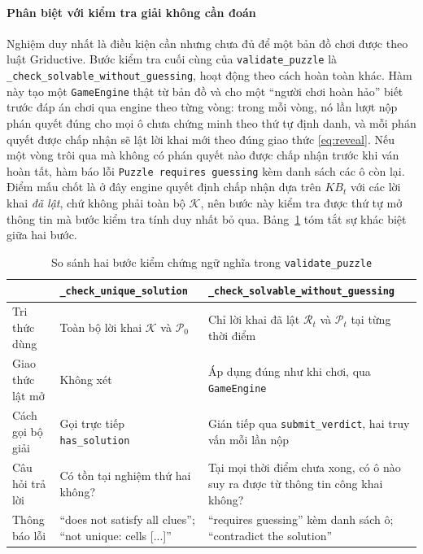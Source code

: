 \begin{sloppypar}
\paragraph{Phân biệt với kiểm tra giải không cần đoán}
Nghiệm duy nhất là điều kiện cần nhưng chưa đủ để một bản đồ chơi được theo luật
Griductive. Bước kiểm tra cuối cùng của \texttt{validate\_puzzle} là
\texttt{\_check\_solvable\_without\_guessing}, hoạt động theo cách hoàn toàn
khác. Hàm này tạo một \texttt{GameEngine} thật từ bản đồ và cho một ``người chơi
hoàn hảo'' biết trước đáp án chơi qua engine theo từng vòng: trong mỗi vòng, nó
lần lượt nộp phán quyết đúng cho mọi ô chưa chứng minh theo thứ tự định danh, và
mỗi phán quyết được chấp nhận sẽ lật lời khai mới theo đúng giao thức
\eqref{eq:reveal}. Nếu một vòng trôi qua mà không có phán quyết nào được chấp
nhận trước khi ván hoàn tất, hàm báo lỗi \texttt{Puzzle requires guessing} kèm
danh sách các ô còn lại. Điểm mấu chốt là ở đây engine quyết định chấp nhận dựa
trên $\mathit{KB}_t$ với các lời khai \emph{đã lật}, chứ không phải toàn bộ
$\mathcal{K}$, nên bước này kiểm tra được thứ tự mở thông tin mà bước kiểm tra
tính duy nhất bỏ qua. Bảng~\ref{tab:unique_vs_guess} tóm tắt sự khác biệt giữa
hai bước.

\begin{table}[htbp]
  \centering\small
  \caption{So sánh hai bước kiểm chứng ngữ nghĩa trong \texttt{validate\_puzzle}}
  \label{tab:unique_vs_guess}
  \begin{tabularx}{\textwidth}{l>{\raggedright\arraybackslash}X>{\raggedright\arraybackslash}X}
    \toprule
    & \textbf{\texttt{\_check\_unique\_\allowbreak solution}}
    & \textbf{\texttt{\_check\_solvable\_\allowbreak without\_guessing}} \\
    \midrule
    Tri thức dùng       & Toàn bộ lời khai $\mathcal{K}$ và $\mathcal{P}_0$
                        & Chỉ lời khai đã lật $\mathcal{R}_t$ và $\mathcal{P}_t$ tại từng thời điểm \\
    Giao thức lật mở    & Không xét & Áp dụng đúng như khi chơi, qua \texttt{GameEngine} \\
    Cách gọi bộ giải    & Gọi trực tiếp \texttt{has\_solution}
                        & Gián tiếp qua \texttt{submit\_verdict}, hai truy vấn mỗi lần nộp \\
    Câu hỏi trả lời     & Có tồn tại nghiệm thứ hai không?
                        & Tại mọi thời điểm chưa xong, có ô nào suy ra được từ thông tin công khai không? \\
    Thông báo lỗi       & ``does not satisfy all clues''; ``not unique: cells [...]''
                        & ``requires guessing'' kèm danh sách ô; ``contradict the solution'' \\
    \bottomrule
  \end{tabularx}
\end{table}


\end{sloppypar}
